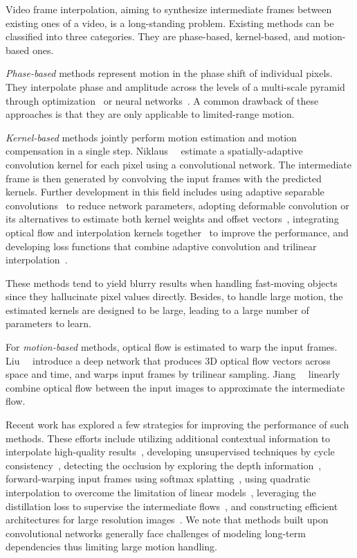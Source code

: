 \documentclass[10pt,twocolumn,letterpaper]{article}
\begin{document}
	Video frame interpolation, aiming to synthesize intermediate frames between existing ones of a video, is a long-standing problem. Existing methods can be classified into three categories. They are phase-based, kernel-based, and motion-based ones. 
	
	\textit{Phase-based} methods represent motion in the phase shift of individual pixels. They interpolate phase and amplitude across the levels of a multi-scale pyramid through optimization~\cite{meyer2015phase} or neural networks~\cite{meyer2018phasenet}. A common drawback of these approaches is that they are only applicable to limited-range motion.
	
	\textit{Kernel-based} methods jointly perform motion estimation and motion compensation in a single step. Niklaus~\etal~\cite{niklaus2017videoaa} estimate a spatially-adaptive convolution kernel for each pixel using a convolutional network. The intermediate frame is then generated by convolving the input frames with the predicted kernels. Further development in this field includes using adaptive separable convolutions~\cite{niklaus2017video} to reduce network parameters, adopting deformable convolution or its alternatives to estimate both kernel weights and offset vectors~\cite{lee2020adacof,shi2020video,cheng2021multiple}, integrating optical flow and interpolation kernels together~\cite{bao2019memc,bao2019depth} to improve the performance, and developing loss functions that combine adaptive convolution and trilinear interpolation~\cite{peleg2019net}. 
	
	These methods tend to yield blurry results when handling fast-moving objects since they hallucinate pixel values directly. Besides, to handle large motion, the estimated kernels are designed to be large, leading to a large number of parameters to learn.
	
	For \textit{motion-based} methods, optical flow is estimated to warp the input frames. Liu~\etal~\cite{liu2017video} introduce a deep network that produces 3D optical flow vectors across space and time, and warps input frames by trilinear sampling. Jiang~\etal~\cite{jiang2018super} linearly combine optical flow between the input images to approximate the intermediate flow. 
	
	Recent work has explored a few strategies for improving the performance of such methods. These efforts include utilizing additional contextual information to interpolate high-quality results~\cite{niklaus2018context}, developing unsupervised techniques by cycle consistency~\cite{reda2019unsupervised}, detecting the occlusion by exploring the depth information~\cite{bao2019depth}, forward-warping input frames using softmax splatting~\cite{softsplat}, using quadratic interpolation to overcome the limitation of linear models~\cite{xu2019quadratic,liu2020enhanced}, leveraging the distillation loss to supervise the intermediate flows~\cite{rife}, and constructing efficient architectures for large resolution images~\cite{sim2021xvfi,choi2021motion}. We note that methods built upon convolutional networks generally face challenges of modeling long-term dependencies thus limiting large motion handling. 
\end{document}
